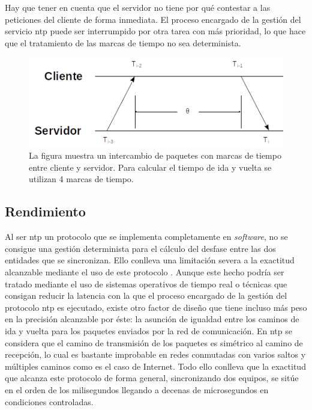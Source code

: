 Hay que tener en cuenta que el servidor no tiene por qué contestar a las 
peticiones del cliente de forma inmediata. El proceso encargado de la gestión 
del servicio \gls{ntp} puede ser interrumpido por otra tarea con más prioridad, 
lo que hace que el tratamiento de las marcas de tiempo no sea determinista.

\begin{figure}
	\centering
	\includegraphics[width=0.7\linewidth]{imagenes/ntp_ts}
	\caption[Cálculo del desfase entre cliente y servidor]{La figura muestra un 
	intercambio de paquetes con marcas de tiempo entre cliente y servidor. Para 
	calcular el tiempo de ida y vuelta se utilizan 4 marcas de tiempo.}
	\label{fig:ntpts}
\end{figure}

\subsection{Rendimiento}

Al ser \gls{ntp} un protocolo que se implementa completamente en 
\textit{software}, no se consigue una gestión determinista para el cálculo del 
desfase entre las dos entidades que se sincronizan. Ello conlleva una 
limitación severa a la exactitud alcanzable mediante el uso de este protocolo 
. Aunque este hecho podría ser tratado mediante el 
uso de sistemas operativos de tiempo real o técnicas que consigan reducir la 
latencia con la que el proceso encargado de la gestión del protocolo \gls{ntp} 
es ejecutado, existe otro factor de diseño que tiene incluso más peso en la 
precisión alcanzable por éste: la asunción de igualdad entre los caminos de ida 
y vuelta para los paquetes enviados por la red de comunicación. En \gls{ntp} se 
considera que el camino de transmisión de los paquetes es simétrico al camino 
de recepción, lo cual es bastante improbable en redes conmutadas con varios 
saltos y múltiples caminos como es el caso de Internet. Todo ello conlleva que 
la exactitud que alcanza este protocolo de forma general, sincronizando dos 
equipos, se sitúe en el orden de los milisegundos llegando a decenas de 
microsegundos en condiciones controladas.